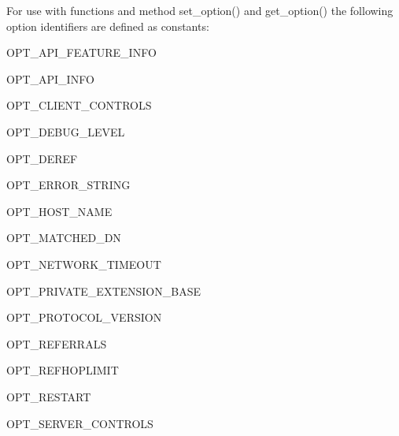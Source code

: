 For use with functions and method set_option() and get_option() the
following option identifiers are defined as constants:

\begin{datadesc}{OPT_API_FEATURE_INFO}
\end{datadesc}

\begin{datadesc}{OPT_API_INFO}
\end{datadesc}

\begin{datadesc}{OPT_CLIENT_CONTROLS}
\end{datadesc}

\begin{datadesc}{OPT_DEBUG_LEVEL}
\end{datadesc}

\begin{datadesc}{OPT_DEREF}
\end{datadesc}

\begin{datadesc}{OPT_ERROR_STRING}
\end{datadesc}

\begin{datadesc}{OPT_HOST_NAME}
\end{datadesc}

\begin{datadesc}{OPT_MATCHED_DN}
\end{datadesc}

\begin{datadesc}{OPT_NETWORK_TIMEOUT}
\end{datadesc}

\begin{datadesc}{OPT_PRIVATE_EXTENSION_BASE}
\end{datadesc}

\begin{datadesc}{OPT_PROTOCOL_VERSION}
\end{datadesc}

\begin{datadesc}{OPT_REFERRALS}
\end{datadesc}

\begin{datadesc}{OPT_REFHOPLIMIT}
\end{datadesc}

\begin{datadesc}{OPT_RESTART}
\end{datadesc}

\begin{datadesc}{OPT_SERVER_CONTROLS}
\end{datadesc}

